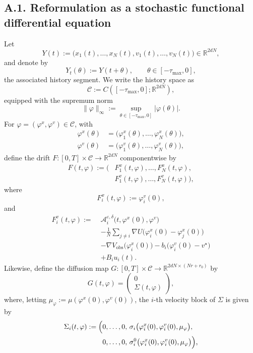 \documentclass[pdflatex,sn-mathphys-num]{sn-jnl}%
\numberwithin{equation}{section}
\theoremstyle{thmstyleone}%
\theoremstyle{remark}
\theoremstyle{definition}
\newcommand{\R}{\mathbb{R}}
\newcommand{\vstar}{v^{\star}}
\begin{document}
\subsection*{A.1. Reformulation as a stochastic functional differential equation}
Let
\[
  Y(t):=
  \bigl(x_1(t),\dots,x_N(t),v_1(t),\dots,v_N(t)\bigr)
  \in\R^{2dN},
\]
and denote by
\[
  Y_t(\theta):=Y(t+\theta),
  \qquad \theta\in[-\tau_{\max},0],
\]
the associated history segment. We write the history space as
\[
  \mathcal C:=C([-\tau_{\max},0];\R^{2dN}),
\]
equipped with the supremum norm
\[
  \|\varphi\|_\infty
  :=\sup_{\theta\in[-\tau_{\max},0]} |\varphi(\theta)|.
\]
For $\varphi=(\varphi^x,\varphi^v)\in\mathcal C$, with
\begin{align*}
  \varphi^x(\theta)&=\bigl(\varphi^x_1(\theta),\dots,\varphi^x_N(\theta)\bigr), \\
  \varphi^v(\theta)&=\bigl(\varphi^v_1(\theta),\dots,\varphi^v_N(\theta)\bigr),
\end{align*}
define the drift $F:[0,T]\times\mathcal C\to\R^{2dN}$ componentwise by
\begin{align*}
  F(t,\varphi)
  := \bigl(&F_1^x(t,\varphi),\dots,F_N^x(t,\varphi), \\
           &F_1^v(t,\varphi),\dots,F_N^v(t,\varphi)\bigr),
\end{align*}
where
\[
  F_i^x(t,\varphi):=\varphi_i^v(0),
\]
and
\begin{equation}\label{eq:appendix-drift}
\begin{aligned}
  F_i^v(t,\varphi)
  :=\;&
  \mathcal A_i^{\varepsilon,\delta}\bigl(t,\varphi^x(0),\varphi^v\bigr) \\
  &- \frac1N \sum_{j\neq i} \nabla U\bigl(\varphi_i^x(0)-\varphi_j^x(0)\bigr) \\
  &- \nabla V_{\mathrm{obs}}\bigl(\varphi_i^x(0)\bigr)
  - b_i\bigl(\varphi_i^v(0)-\vstar\bigr) \\
  &+ B_i u_i(t).
\end{aligned}
\end{equation}
Likewise, define the diffusion map
$G:[0,T]\times\mathcal C\to\R^{2dN\times(Nr+r_0)}$ by
\[
  G(t,\varphi)
  =
  \begin{pmatrix}
    0 \\
    \Sigma(t,\varphi)
  \end{pmatrix},
\]
where, letting $\mu_\varphi := \mu(\varphi^x(0),\varphi^v(0))$, the $i$-th
velocity block of $\Sigma$ is given by
\begin{equation*}
\begin{aligned}
  \Sigma_i(t,\varphi)
  := \Bigl(& 0,\dots,0,\, \sigma_i\bigl(\varphi_i^x(0),\varphi_i^v(0),\mu_\varphi\bigr), \\
  & 0,\dots,0,\, \sigma_i^0\bigl(\varphi_i^x(0),\varphi_i^v(0),\mu_\varphi\bigr) \Bigr),
\end{aligned}
\end{equation*}
\end{document}
